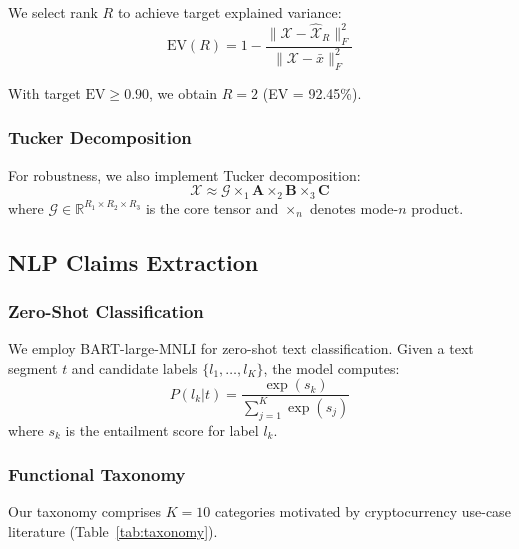 \documentclass[11pt,twocolumn]{article}
\begin{document}
We select rank $R$ to achieve target explained variance:
\begin{equation}
\text{EV}(R) = 1 - \frac{\|\mathcal{X} - \hat{\mathcal{X}}_R\|_F^2}{\|\mathcal{X} - \bar{x}\|_F^2}
\end{equation}

With target $\text{EV} \geq 0.90$, we obtain $R = 2$ (EV = 92.45\%).

\subsubsection{Tucker Decomposition}

For robustness, we also implement Tucker decomposition:
\begin{equation}
\mathcal{X} \approx \mathcal{G} \times_1 \mathbf{A} \times_2 \mathbf{B} \times_3 \mathbf{C}
\end{equation}
where $\mathcal{G} \in \mathbb{R}^{R_1 \times R_2 \times R_3}$ is the core tensor and $\times_n$ denotes mode-$n$ product.

\subsection{NLP Claims Extraction}

\subsubsection{Zero-Shot Classification}

We employ BART-large-MNLI \citep{lewis2020bart} for zero-shot text classification. Given a text segment $t$ and candidate labels $\{l_1, \ldots, l_K\}$, the model computes:
\begin{equation}
P(l_k | t) = \frac{\exp(s_k)}{\sum_{j=1}^K \exp(s_j)}
\end{equation}
where $s_k$ is the entailment score for label $l_k$.

\subsubsection{Functional Taxonomy}

Our taxonomy comprises $K = 10$ categories motivated by cryptocurrency use-case literature (Table~\ref{tab:taxonomy}).
\end{document}
